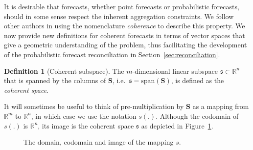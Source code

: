 \documentclass[12pt]{article}
\theoremstyle{definition}
\newtheorem{definition}{Definition}[section]
\begin{document}
It is desirable that forecasts, whether point forecasts or probabilistic forecasts, should in some sense respect the inherent aggregation constraints. We follow other authors \citep{Wickramasuriya2017, FPP2018} in using the nomenclature \emph{coherence} to describe this property.
We now provide new definitions for coherent forecasts in terms of vector spaces that give a geometric understanding of the problem, thus facilitating the development of the probabilistic forecast reconciliation in Section~\ref{sec:reconciliation}.

\begin{definition}[Coherent subspace]\label{def:cohspace}
 The $m$-dimensional linear subspace $\mathfrak{s}\subset \mathbb{R}^n$ that is spanned by the columns of $\bm{S}$, i.e.\ $\mathfrak{s}=\text{span}(\bm{S})$, is defined as the \emph{coherent space}.
\end{definition}

It will sometimes be useful to think of pre-multiplication by $\bm{S}$ as a mapping from $\mathbb{R}^m$ to $\mathbb{R}^n$, in which case we use the notation $s(.)$. Although the codomain of $s(.)$ is $\mathbb{R}^n$, its image is the coherent space $\mathfrak{s}$ as depicted in Figure~\ref{fig2}.

\begin{figure}[H]
  \begin{center}
  \end{center}
  \caption{The domain, codomain and image of the mapping $s$.}\label{fig2}
\end{figure}
\end{document}

